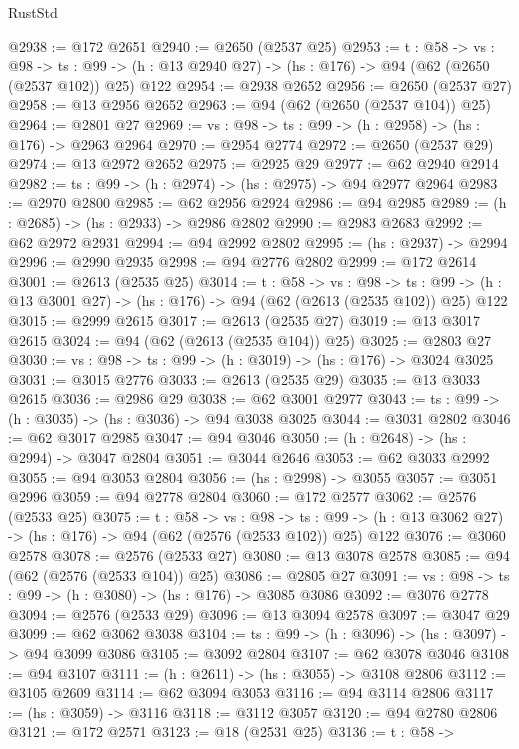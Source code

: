 \begin{lexlean}{RustStd}
\begin{coremodule}
@2938 := @172 @2651
@2940 := @2650 (@2537 @25)
@2953 := {t : @58} ->
  {vs : @98} ->
  {ts : @99} -> (h : @13 @2940 @27) -> (hs : @176) -> @94 (@62 (@2650 (@2537 @102)) @25) @122
@2954 := @2938 @2652
@2956 := @2650 (@2537 @27)
@2958 := @13 @2956 @2652
@2963 := @94 (@62 (@2650 (@2537 @104)) @25)
@2964 := @2801 @27
@2969 := {vs : @98} -> {ts : @99} -> (h : @2958) -> (hs : @176) -> @2963 @2964
@2970 := @2954 @2774
@2972 := @2650 (@2537 @29)
@2974 := @13 @2972 @2652
@2975 := @2925 @29
@2977 := @62 @2940 @2914
@2982 := {ts : @99} -> (h : @2974) -> (hs : @2975) -> @94 @2977 @2964
@2983 := @2970 @2800
@2985 := @62 @2956 @2924
@2986 := @94 @2985
@2989 := (h : @2685) -> (hs : @2933) -> @2986 @2802
@2990 := @2983 @2683
@2992 := @62 @2972 @2931
@2994 := @94 @2992 @2802
@2995 := (hs : @2937) -> @2994
@2996 := @2990 @2935
@2998 := @94 @2776 @2802
@2999 := @172 @2614
@3001 := @2613 (@2535 @25)
@3014 := {t : @58} ->
  {vs : @98} ->
  {ts : @99} -> (h : @13 @3001 @27) -> (hs : @176) -> @94 (@62 (@2613 (@2535 @102)) @25) @122
@3015 := @2999 @2615
@3017 := @2613 (@2535 @27)
@3019 := @13 @3017 @2615
@3024 := @94 (@62 (@2613 (@2535 @104)) @25)
@3025 := @2803 @27
@3030 := {vs : @98} -> {ts : @99} -> (h : @3019) -> (hs : @176) -> @3024 @3025
@3031 := @3015 @2776
@3033 := @2613 (@2535 @29)
@3035 := @13 @3033 @2615
@3036 := @2986 @29
@3038 := @62 @3001 @2977
@3043 := {ts : @99} -> (h : @3035) -> (hs : @3036) -> @94 @3038 @3025
@3044 := @3031 @2802
@3046 := @62 @3017 @2985
@3047 := @94 @3046
@3050 := (h : @2648) -> (hs : @2994) -> @3047 @2804
@3051 := @3044 @2646
@3053 := @62 @3033 @2992
@3055 := @94 @3053 @2804
@3056 := (hs : @2998) -> @3055
@3057 := @3051 @2996
@3059 := @94 @2778 @2804
@3060 := @172 @2577
@3062 := @2576 (@2533 @25)
@3075 := {t : @58} ->
  {vs : @98} ->
  {ts : @99} -> (h : @13 @3062 @27) -> (hs : @176) -> @94 (@62 (@2576 (@2533 @102)) @25) @122
@3076 := @3060 @2578
@3078 := @2576 (@2533 @27)
@3080 := @13 @3078 @2578
@3085 := @94 (@62 (@2576 (@2533 @104)) @25)
@3086 := @2805 @27
@3091 := {vs : @98} -> {ts : @99} -> (h : @3080) -> (hs : @176) -> @3085 @3086
@3092 := @3076 @2778
@3094 := @2576 (@2533 @29)
@3096 := @13 @3094 @2578
@3097 := @3047 @29
@3099 := @62 @3062 @3038
@3104 := {ts : @99} -> (h : @3096) -> (hs : @3097) -> @94 @3099 @3086
@3105 := @3092 @2804
@3107 := @62 @3078 @3046
@3108 := @94 @3107
@3111 := (h : @2611) -> (hs : @3055) -> @3108 @2806
@3112 := @3105 @2609
@3114 := @62 @3094 @3053
@3116 := @94 @3114 @2806
@3117 := (hs : @3059) -> @3116
@3118 := @3112 @3057
@3120 := @94 @2780 @2806
@3121 := @172 @2571
@3123 := @18 (@2531 @25)
@3136 := {t : @58} ->

\end{coremodule}
\end{lexlean}

